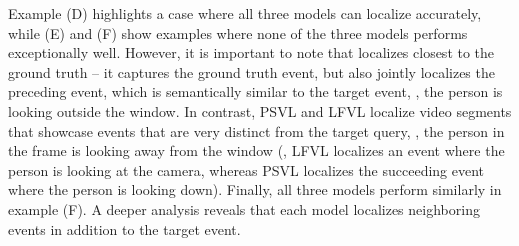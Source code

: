 Example (D) highlights a case where all three models can localize accurately, while (E) and (F) show examples where none of the three models performs exceptionally well. However, it is important to note that \modelname localizes closest to the ground truth -- it captures the ground truth event, but also jointly localizes the preceding event, which is semantically similar to the target event, \ie, the person is looking outside the window. In contrast, PSVL and LFVL localize video segments that showcase events that are very distinct from the target query, \ie, the person in the frame is looking away from the window (\eg, LFVL localizes an event where the person is looking at the camera, whereas PSVL localizes the succeeding event where the person is looking down). Finally, all three models perform similarly in example (F). A deeper analysis reveals that each model localizes neighboring events in addition to the target event. 
